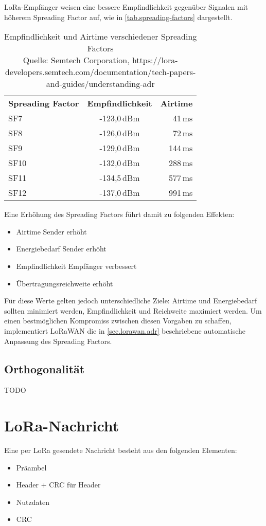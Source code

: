 LoRa-Empfänger weisen eine bessere Empfindlichkeit gegenüber Signalen mit höherem Spreading Factor auf, wie in \autoref{tab.spreading-factors} dargestellt.
\begin{table}[htbp]
\centering
\begin{tabular}{@{}lcr@{}}
\textbf{Spreading Factor} & \textbf{Empfindlichkeit} & \textbf{Airtime} \\
SF7  & -123,0\,dBm &  41\,ms \\
SF8  & -126,0\,dBm &  72\,ms \\
SF9  & -129,0\,dBm & 144\,ms \\
SF10 & -132,0\,dBm & 288\,ms \\
SF11 & -134,5\,dBm & 577\,ms \\
SF12 & -137,0\,dBm & 991\,ms \\
\end{tabular}
\caption[Empfindlichkeit und Airtime verschiedener Spreading Factors]{Empfindlichkeit und Airtime verschiedener Spreading Factors\\Quelle: Semtech Corporation, https://lora-developers.semtech.com/documentation/tech-papers-and-guides/understanding-adr}
\label{tab.spreading-factors}
\end{table}
Eine Erhöhung des Spreading Factors führt damit zu folgenden Effekten:
\begin{itemize}\singlespacing\setlength\itemsep{-0.2em}
\item Airtime Sender erhöht
\item Energiebedarf Sender erhöht
\item Empfindlichkeit Empfänger verbessert
\item Übertragungsreichweite erhöht
\end{itemize}
Für diese Werte gelten jedoch unterschiedliche Ziele: Airtime und Energiebedarf sollten minimiert werden, Empfindlichkeit und Reichweite maximiert werden.\cite{loralimits}
Um einen bestmöglichen Kompromiss zwischen diesen Vorgaben zu schaffen, implementiert LoRaWAN die in \autoref{sec.lorawan.adr} beschriebene automatische Anpassung des Spreading Factors.


\subsection{Orthogonalität}
TODO


\section{LoRa-Nachricht}
Eine per LoRa gesendete Nachricht besteht aus den folgenden Elementen:\cite{loralimits}
\begin{itemize}\singlespacing\setlength\itemsep{-0.2em}
\item Präambel
\item Header + \gls{CRC} für Header
\item Nutzdaten
\item \gls{CRC}
\end{itemize}

